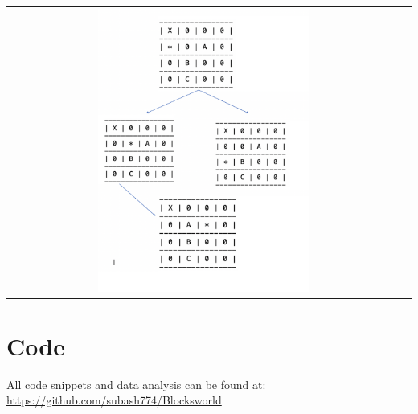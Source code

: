 \documentclass[10pt]{article}
\begin{document}
  \begin{center}
    \begin{tabular}{cc}
    \includegraphics[width=0.55\textwidth]{images/blocks.png} \\
      \end{tabular}
    \end{center}


 
 

  \section{Code}
  All code snippets and data analysis can be found at: \url{https://github.com/subash774/Blocksworld}
\end{document}
